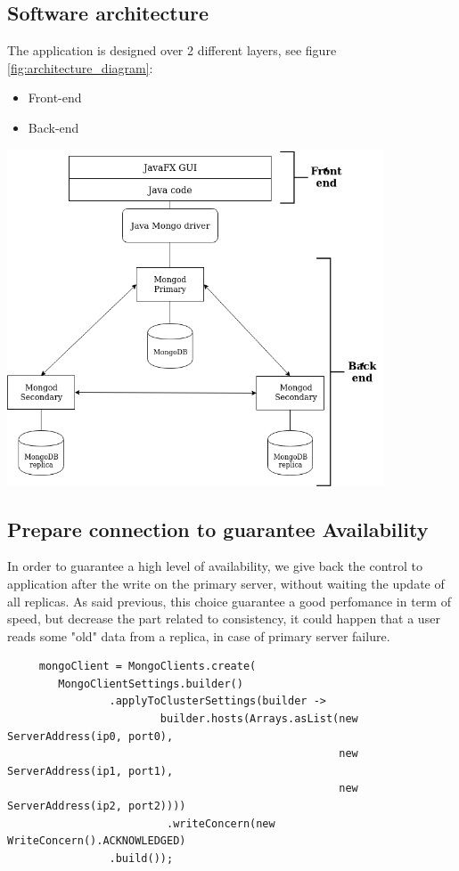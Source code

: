 \documentclass[a4paper, oneside]{article}
\begin{document}
\subsection{Software architecture}
The application is designed over 2 different layers, see figure \ref{fig:architecture_diagram}:
\begin{itemize}
\item Front-end
\item Back-end
\end{itemize}
\vspace{5mm}
\begin{minipage}{\linewidth}
\begin{center}
\vspace{1mm}
\includegraphics[height = 100mm]{./images/diagrams/architecture_diagram.png} 
\vspace{6mm}
\label{fig:architecture_diagram}
\end{center}
\end{minipage}
\vspace{7mm}
\clearpage


\subsection{Prepare connection to guarantee Availability}
In order to guarantee a high level of availability, we give back the control to application after the write on the primary server, without waiting the update of all replicas.
As said previous, this choice guarantee a good perfomance in term of speed, but decrease the part related to consistency, it could happen that a user reads some "old" data from a replica, in case of primary server failure.
\begin{verbatim}
     mongoClient = MongoClients.create(
        MongoClientSettings.builder()
                .applyToClusterSettings(builder ->
                        builder.hosts(Arrays.asList(new ServerAddress(ip0, port0),
                                                    new ServerAddress(ip1, port1),
                                                    new ServerAddress(ip2, port2))))
                         .writeConcern(new WriteConcern().ACKNOWLEDGED)
                .build());
\end{verbatim}
\end{document}

